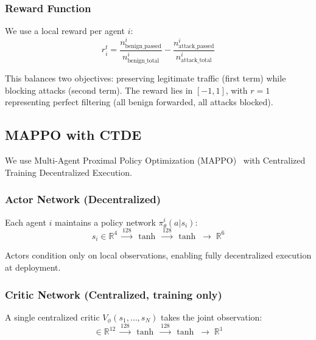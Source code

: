 \documentclass[sigconf,nonacm]{acmart}
\begin{document}
\subsubsection{Reward Function}

We use a local reward per agent $i$:
\begin{equation}
    r_i^t = \frac{n_\text{benign\_passed}^i}{n_\text{benign\_total}^i} - \frac{n_\text{attack\_passed}^i}{n_\text{attack\_total}^i}
    \label{eq:reward}
\end{equation}

This balances two objectives: preserving legitimate traffic (first term) while blocking attacks (second term). The reward lies in $[-1, 1]$, with $r = 1$ representing perfect filtering (all benign forwarded, all attacks blocked).

\subsection{MAPPO with CTDE}
\label{sec:mappo}

We use Multi-Agent Proximal Policy Optimization (MAPPO)~\cite{yu2022surprising} with Centralized Training Decentralized Execution.

\subsubsection{Actor Network (Decentralized)}

Each agent $i$ maintains a policy network $\pi_\theta^i(a | s_i)$:
\begin{equation}
    s_i \in \mathbb{R}^4 \;\xrightarrow{128}\; \tanh \;\xrightarrow{128}\; \tanh \;\xrightarrow{}\; \mathbb{R}^6
\end{equation}

Actors condition only on local observations, enabling fully decentralized execution at deployment.

\subsubsection{Critic Network (Centralized, training only)}

A single centralized critic $V_\phi(s_1, \ldots, s_N)$ takes the joint observation:
\begin{equation}
    [s_1 \| s_2 \| s_3] \in \mathbb{R}^{12} \;\xrightarrow{128}\; \tanh \;\xrightarrow{128}\; \tanh \;\xrightarrow{}\; \mathbb{R}^1
\end{equation}
\end{document}
